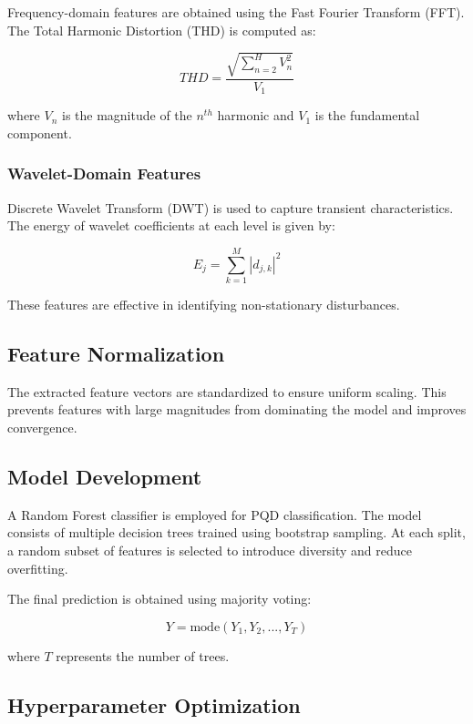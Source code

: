 \documentclass[conference]{IEEEtran}
\begin{document}
Frequency-domain features are obtained using the Fast Fourier Transform (FFT). The Total Harmonic Distortion (THD) is computed as:

\begin{equation}
THD = \frac{\sqrt{\sum_{n=2}^{H} V_n^2}}{V_1}
\end{equation}

where $V_n$ is the magnitude of the $n^{th}$ harmonic and $V_1$ is the fundamental component.

\subsubsection{Wavelet-Domain Features}

Discrete Wavelet Transform (DWT) is used to capture transient characteristics. The energy of wavelet coefficients at each level is given by:

\begin{equation}
E_j = \sum_{k=1}^{M} |d_{j,k}|^2
\end{equation}

These features are effective in identifying non-stationary disturbances.

\subsection{Feature Normalization}

The extracted feature vectors are standardized to ensure uniform scaling. This prevents features with large magnitudes from dominating the model and improves convergence.

\subsection{Model Development}

A Random Forest classifier is employed for PQD classification. The model consists of multiple decision trees trained using bootstrap sampling. At each split, a random subset of features is selected to introduce diversity and reduce overfitting.

The final prediction is obtained using majority voting:

\begin{equation}
Y = \text{mode}(Y_1, Y_2, ..., Y_T)
\end{equation}

where $T$ represents the number of trees.

\subsection{Hyperparameter Optimization}
\end{document}
